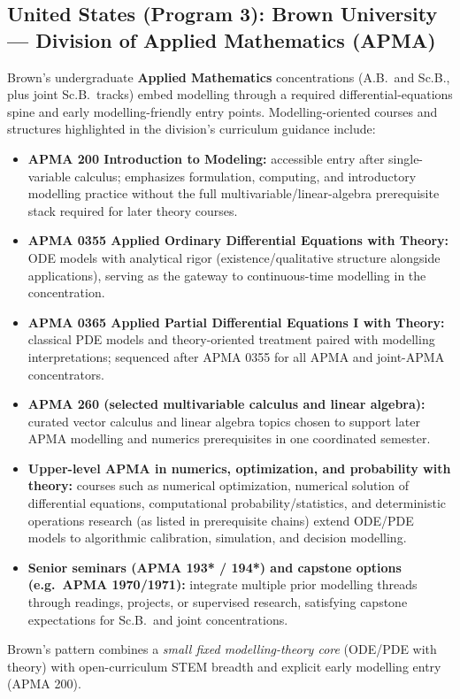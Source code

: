 ﻿\documentclass[11pt,a4paper]{article}
\begin{document}
\subsection*{United States (Program 3): Brown University --- Division of Applied Mathematics (APMA)}
Brown's undergraduate \textbf{Applied Mathematics} concentrations (A.B.\ and Sc.B., plus joint Sc.B.\ tracks) embed modelling through a required differential-equations spine and early modelling-friendly entry points. Modelling-oriented courses and structures highlighted in the division's curriculum guidance include:
\begin{itemize}[leftmargin=*]
  \item \textbf{APMA 200 Introduction to Modeling:} accessible entry after single-variable calculus; emphasizes formulation, computing, and introductory modelling practice without the full multivariable/linear-algebra prerequisite stack required for later theory courses.
  \item \textbf{APMA 0355 Applied Ordinary Differential Equations with Theory:} ODE models with analytical rigor (existence/qualitative structure alongside applications), serving as the gateway to continuous-time modelling in the concentration.
  \item \textbf{APMA 0365 Applied Partial Differential Equations I with Theory:} classical PDE models and theory-oriented treatment paired with modelling interpretations; sequenced after APMA 0355 for all APMA and joint-APMA concentrators.
  \item \textbf{APMA 260 (selected multivariable calculus and linear algebra):} curated vector calculus and linear algebra topics chosen to support later APMA modelling and numerics prerequisites in one coordinated semester.
  \item \textbf{Upper-level APMA in numerics, optimization, and probability with theory:} courses such as numerical optimization, numerical solution of differential equations, computational probability/statistics, and deterministic operations research (as listed in prerequisite chains) extend ODE/PDE models to algorithmic calibration, simulation, and decision modelling.
  \item \textbf{Senior seminars (APMA 193* / 194*) and capstone options (e.g.\ APMA 1970/1971):} integrate multiple prior modelling threads through readings, projects, or supervised research, satisfying capstone expectations for Sc.B.\ and joint concentrations.
\end{itemize}
Brown's pattern combines a \emph{small fixed modelling-theory core} (ODE/PDE with theory) with open-curriculum STEM breadth and explicit early modelling entry (APMA 200).
\end{document}
